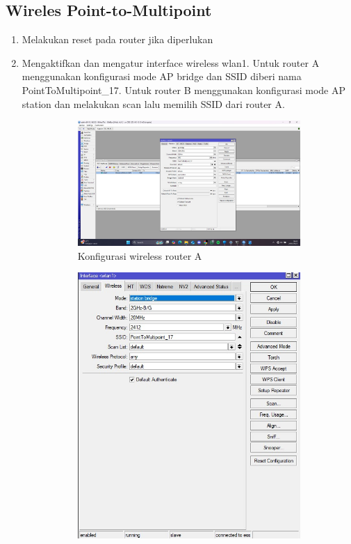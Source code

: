 \subsection{Wireles Point-to-Multipoint}
\begin{enumerate}
	\item Melakukan reset pada router jika diperlukan
	\item Mengaktifkan dan mengatur interface wireless wlan1. Untuk router A menggunakan konfigurasi mode AP bridge dan SSID diberi nama PointToMultipoint\_17. Untuk router B menggunakan konfigurasi mode AP station dan melakukan scan lalu memilih SSID dari router A.
	\begin{figure}[H]
		\centering
		\begin{subfigure}[b]{0.4\linewidth}
			\centering
			\includegraphics[width=\linewidth]{P3/img/pmp rtrA 1.jpg}
			\caption{Konfigurasi wireless router A\label{fig:konfigurasiR1}}
		\end{subfigure}
		\begin{subfigure}[b]{0.4\linewidth}
			\centering
			\includegraphics[width=\linewidth]{P3/img/pmp rtrB 1.jpg}

\end{subfigure}
\end{figure}
\end{enumerate}
